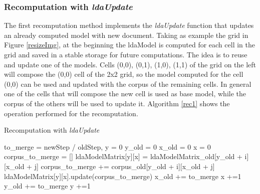 \documentclass{sig-alternate-05-2015}
\begin{document}
\subsubsection{Recomputation with \textit{ldaUpdate}}
The first recomputation method implements the \textit{ldaUpdate} function that updates an already computed model with new document. Taking as example the grid in Figure \ref{resizeImg}, at the beginning the ldaModel is computed for each cell in the grid and saved in a stable storage for future computations. The idea is to reuse and update one of the models. Cells (0,0), (0,1), (1,0), (1,1) of the grid on the left will compose the (0,0) cell of the 2x2 grid, so the model computed for the cell (0,0) can be used and updated with the corpus of the remaining cells. In general one of the cells that will compose the new cell is used as base model, while the corpus of the others will be used to update it. Algorithm \ref{rec1} shows the operation performed for the recomputation.
\begin{algorithm*}[h]
\caption{Recomputation with \textit{ldaUpdate}}\label{rec1}
\begin{algorithmic}[1]
	\State to\_merge = newStep / oldStep,
    \State y = 0
    \State y\_old = 0
    	\State x\_old = 0
    	\State x = 0
			\State corpus\_to\_merge = []
   						\State ldaModelMatrix[y][x] = ldaModelMatrix\_old[y\_old + i][x\_old + j] 
   					\Else
   						\State corpus\_to\_merge += corpus\_old[y\_old + i][x\_old + j] 
   					\EndIf
   				\EndFor
   			\EndFor
   				\State ldaModelMatrix[y][x].update(corpus\_to\_merge) 
   			\EndIf
   			\State x\_old += to\_merge
   			\State x +=1
   		\EndWhile
   		\State y\_old += to\_merge
   		\State y +=1
    \EndWhile
\EndProcedure
\end{algorithmic}
\end{algorithm*}
\end{document}
